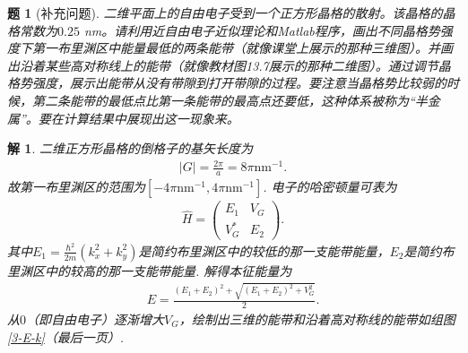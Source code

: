 \documentclass[UTF8,10pt,a4paper]{article}
\theoremstyle{Problem}
\newtheorem{prob}{题}
\theoremstyle{Solution}
\newtheorem*{sol}{解}
\providecommand{\abs}[1]{\left\lvert#1\right\rvert}
\begin{document}
\begin{prob}[补充问题]
    二维平面上的自由电子受到一个正方形晶格的散射。该晶格的晶格常数为$0.25$ nm。请利用近自由电子近似理论和Matlab程序，画出不同晶格势强度下第一布里渊区中能量最低的两条能带（就像课堂上展示的那种三维图）。并画出沿着某些高对称线上的能带（就像教材图13.7展示的那种二维图）。通过调节晶格势强度，展示出能带从没有带隙到打开带隙的过程。要注意当晶格势比较弱的时候，第二条能带的最低点比第一条能带的最高点还要低，这种体系被称为“半金属”。要在计算结果中展现出这一现象来。
\end{prob}
\begin{sol}
    二维正方形晶格的倒格子的基矢长度为
    \begin{align}
        \abs{G}=\frac{2\pi}{a}=8\pi\text{nm}^{-1}.
    \end{align}
    故第一布里渊区的范围为$[-4\pi\text{nm}^{-1},4\pi\text{nm}^{-1}]$.
    电子的哈密顿量可表为
    \begin{align}
        \hat{H}=\left(\begin{matrix}
            E_1&V_G\\
            V_G^*&E_2
        \end{matrix}\right).
    \end{align}
    其中$E_1=\frac{\hbar^2}{2m}(k_x^2+k_y^2)$是简约布里渊区中的较低的那一支能带能量，$E_2$是简约布里渊区中的较高的那一支能带能量.
    解得本征能量为
    \begin{align}
        E=\frac{(E_1+E_2)^2+\sqrt{(E_1+E_2)^2+V_G^2}}{2}.
    \end{align}
    从$0$（即自由电子）逐渐增大$V_G$，绘制出三维的能带和沿着高对称线的能带如组图\ref{3-E-k}（最后一页）.
    \newpage
    \begin{figure}[h]
        \centering

\end{figure}
\end{sol}
\end{document}
